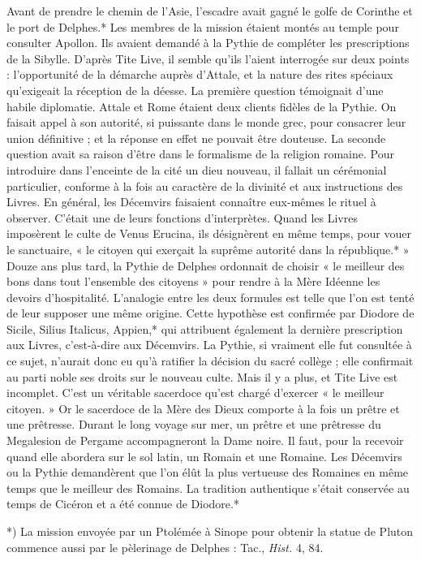 \documentclass[a4paper, 11pt, oneside, polutonikogreek, french]{article}
\begin{document}
Avant de prendre le chemin de l'Asie, l'escadre avait gagné le golfe de Corinthe et le port de Delphes.* Les membres de la mission étaient montés au temple pour consulter Apollon. Ils avaient demandé à la Pythie de compléter les prescriptions de la Sibylle. D'après Tite Live, il semble qu'ils l'aient interrogée sur deux points : l'opportunité de la démarche auprès d'Attale, et la nature des rites spéciaux qu'exigeait la réception de la déesse. La première question témoignait d'une habile diplomatie. Attale et Rome étaient deux clients fidèles de la Pythie. On faisait appel à son autorité, si puissante dans le monde grec, pour consacrer leur union définitive ; et la réponse en effet ne pouvait être douteuse. La seconde question avait sa raison d'être dans le formalisme de la religion romaine. Pour introduire dans l'enceinte de la cité un dieu nouveau, il fallait un cérémonial particulier, conforme à la fois au caractère de la divinité et aux instructions des Livres. En général, les Décemvirs faisaient connaître eux-mêmes le rituel à observer. C'était une de leurs fonctions d'interprètes. Quand les Livres imposèrent le culte de Venus Erucina, ils désignèrent en même temps, pour vouer le sanctuaire, « le citoyen qui exerçait la suprême autorité dans la république.* » Douze ans plus tard, la Pythie de Delphes ordonnait de choisir « le meilleur des bons dans tout l'ensemble des citoyens » pour rendre à la Mère Idéenne les devoirs d'hospitalité. L'analogie entre les deux formules est telle que l'on est tenté de leur supposer une même origine. Cette hypothèse est confirmée par Diodore de Sicile, Silius Italicus, Appien,* qui attribuent également la dernière prescription aux Livres, c'est-à-dire aux Décemvirs. La Pythie, si vraiment elle fut consultée à ce sujet, n'aurait donc eu qu'à ratifier la décision du sacré collège ; elle confirmait au parti noble ses droits sur le nouveau culte. Mais il y a plus, et Tite Live est incomplet. C'est un véritable sacerdoce qu'est chargé d'exercer « le meilleur citoyen. » Or le sacerdoce de la Mère des Dieux comporte à la fois un prêtre et une prêtresse. Durant le long voyage sur mer, un prêtre et une prêtresse du Megalesion de Pergame accompagneront la Dame noire. Il faut, pour la recevoir quand elle abordera sur le sol latin, un Romain et une Romaine. Les Décemvirs ou la Pythie demandèrent que l'on élût la plus vertueuse des Romaines en même temps que le meilleur des Romains. La tradition authentique s'était conservée au temps de Cicéron et a été connue de Diodore.*

*) La mission envoyée par un Ptolémée à Sinope pour obtenir la statue de Pluton commence aussi par le pèlerinage de Delphes : Tac., \emph{Hist.} 4, 84.
\end{document}

